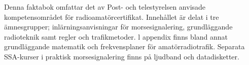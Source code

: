 Denna faktabok omfattar det av Post- och telestyrelsen anvisade kompetensområdet för
radioamatörcertifikat.
Innehållet är delat i tre ämnesgrupper; inlärningsanvisningar för morsesignalering,
grundläggande radioteknik samt regler och trafikmetoder. l appendix finns bland annat
grundläggande matematik och frekvensplaner för amatörradiotrafik.
Separata SSA-kurser i praktisk morsesignalering finns på ljudband och datadisketter.

